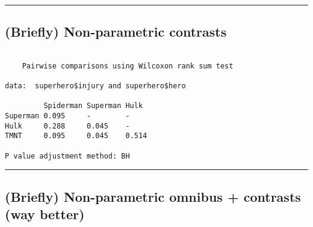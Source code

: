 \documentclass[]{article}
\newenvironment{Shaded}{\begin{snugshade}}{\end{snugshade}}
\newcommand{\DataTypeTok}[1]{\textcolor[rgb]{0.13,0.29,0.53}{#1}}
\newcommand{\DecValTok}[1]{\textcolor[rgb]{0.00,0.00,0.81}{#1}}
\newcommand{\KeywordTok}[1]{\textcolor[rgb]{0.13,0.29,0.53}{\textbf{#1}}}
\newcommand{\NormalTok}[1]{#1}
\newcommand{\OperatorTok}[1]{\textcolor[rgb]{0.81,0.36,0.00}{\textbf{#1}}}
\newcommand{\StringTok}[1]{\textcolor[rgb]{0.31,0.60,0.02}{#1}}
\begin{document}
\begin{center}\rule{0.5\linewidth}{\linethickness}\end{center}

\hypertarget{briefly-non-parametric-contrasts}{%
\subsection{(Briefly) Non-parametric
contrasts}\label{briefly-non-parametric-contrasts}}

\begin{Shaded}
\end{Shaded}

\begin{verbatim}

    Pairwise comparisons using Wilcoxon rank sum test 

data:  superhero$injury and superhero$hero 

         Spiderman Superman Hulk 
Superman 0.095     -        -    
Hulk     0.288     0.045    -    
TMNT     0.095     0.045    0.514

P value adjustment method: BH 
\end{verbatim}

\begin{center}\rule{0.5\linewidth}{\linethickness}\end{center}

\hypertarget{briefly-non-parametric-omnibus-contrasts-way-better}{%
\subsection{(Briefly) Non-parametric omnibus + contrasts (way
better)}\label{briefly-non-parametric-omnibus-contrasts-way-better}}

\begin{Shaded}
\end{Shaded}
\end{document}

